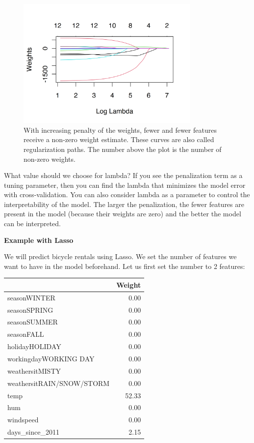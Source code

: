 \documentclass[
  10pt,
]{scrbook}
\begin{document}
\begin{figure}

{\centering \includegraphics[width=0.8\textwidth]{images/lasso-path-1} 

}

\caption{With increasing penalty of the weights, fewer and fewer features receive a non-zero weight estimate. These curves are also called regularization paths. The number above the plot is the number of non-zero weights.}\label{fig:lasso-path}
\end{figure}

What value should we choose for lambda?
If you see the penalization term as a tuning parameter, then you can find the lambda that minimizes the model error with cross-validation.
You can also consider lambda as a parameter to control the interpretability of the model.
The larger the penalization, the fewer features are present in the model (because their weights are zero) and the better the model can be interpreted.

\textbf{Example with Lasso}

We will predict bicycle rentals using Lasso.
We set the number of features we want to have in the model beforehand.
Let us first set the number to 2 features:

\begin{table}
\centering
\begin{tabular}{lr}
\toprule
  & Weight\\
\midrule
seasonWINTER & 0.00\\
seasonSPRING & 0.00\\
seasonSUMMER & 0.00\\
seasonFALL & 0.00\\
holidayHOLIDAY & 0.00\\
\addlinespace
workingdayWORKING DAY & 0.00\\
weathersitMISTY & 0.00\\
weathersitRAIN/SNOW/STORM & 0.00\\
temp & 52.33\\
hum & 0.00\\
\addlinespace
windspeed & 0.00\\
days\_since\_2011 & 2.15\\
\bottomrule
\end{tabular}
\end{table}
\end{document}

